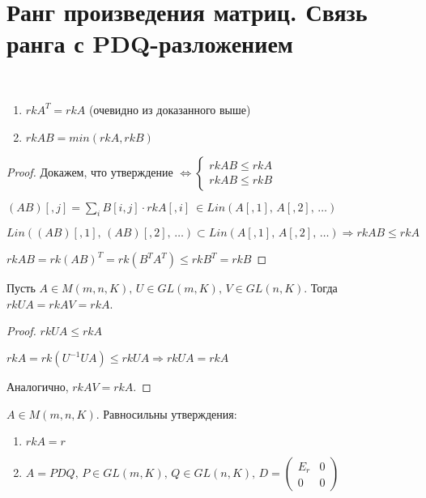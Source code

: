 \section{Ранг произведения матриц. Связь ранга с PDQ-разложением}

\begin{theorem-non} 
    \
    \begin{enumerate}
        \item $rk A^T = rk A$ (очевидно из доказанного выше)
        \item $rk AB = min(rk A, rk B)$
    \end{enumerate}

    \begin{proof}
        
        Докажем, что утверждение $\Longleftrightarrow
        \begin{cases}
            rk AB \leq rk A\\
            rk AB \leq rk B
        \end{cases}$

        $(AB)[, j] = \sum_i B[i,j] \cdot rk A[, i] \ \in Lin(A[, 1],\, A[, 2],\, \dots)$

        $Lin((AB)[, 1],\, (AB)[, 2],\, \dots) \subset Lin(A[, 1],\, A[, 2],\, \dots) \Longrightarrow rk AB \leq rk A$

        $rk AB = rk (AB)^T = rk (B^T A^T) \leq rk B^T = rk B$

    \end{proof}

\end{theorem-non}

\follow Пусть $A \in M(m, n, K),\, U \in GL(m, K),\, V \in GL(n, K)$. Тогда $rk UA = rk AV = rk A$.
\begin{proof}
    
    $rk UA \leq rk A$

    $rk A = rk(U^{-1}UA) \leq rk UA \Longrightarrow rk UA = rk A$

    Аналогично, $rk AV = rk A$.

\end{proof}

\follow $A \in M(m, n, K)$. Равносильны утверждения:
\begin{enumerate}
    \item $rk A = r$
    \item $A = PDQ,\, P \in GL(m, K),\, Q \in GL(n, K),\, D =
    \begin{pmatrix}
        E_r & 0\\
        0 & 0
    \end{pmatrix}$
\end{enumerate}

